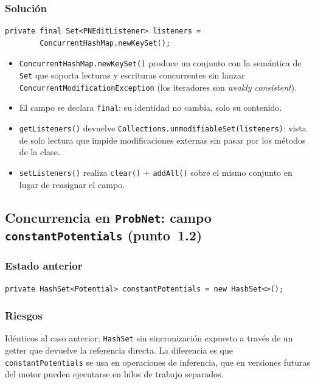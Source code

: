 \documentclass[11pt,a4paper]{article}
\newcommand{\code}[1]{\texttt{#1}}
\begin{document}
\subsubsection*{Solución}

\begin{lstlisting}
private final Set<PNEditListener> listeners =
        ConcurrentHashMap.newKeySet();
\end{lstlisting}

\begin{itemize}
  \item \code{ConcurrentHashMap.newKeySet()} produce un conjunto con la
    semántica de \code{Set} que soporta lecturas y escrituras concurrentes
    sin lanzar \code{ConcurrentModificationException} (los iteradores son
    \emph{weakly consistent}).
  \item El campo se declara \code{final}: su identidad no cambia, solo
    su contenido.
  \item \code{getListeners()} devuelve
    \code{Collections.unmodifiableSet(listeners)}: vista de solo lectura
    que impide modificaciones externas sin pasar por los métodos de la
    clase.
  \item \code{setListeners()} realiza \code{clear()} + \code{addAll()}
    sobre el mismo conjunto en lugar de reasignar el campo.
\end{itemize}

\subsection{Concurrencia en \code{ProbNet}: campo \code{constantPotentials}
            (punto~1.2)}

\subsubsection*{Estado anterior}

\begin{lstlisting}
private HashSet<Potential> constantPotentials = new HashSet<>();
\end{lstlisting}

\subsubsection*{Riesgos}

Idénticos al caso anterior: \code{HashSet} sin sincronización expuesto a
través de un getter que devuelve la referencia directa. La diferencia es
que \code{constantPotentials} se usa en operaciones de inferencia, que en
versiones futuras del motor pueden ejecutarse en hilos de trabajo separados.
\end{document}
